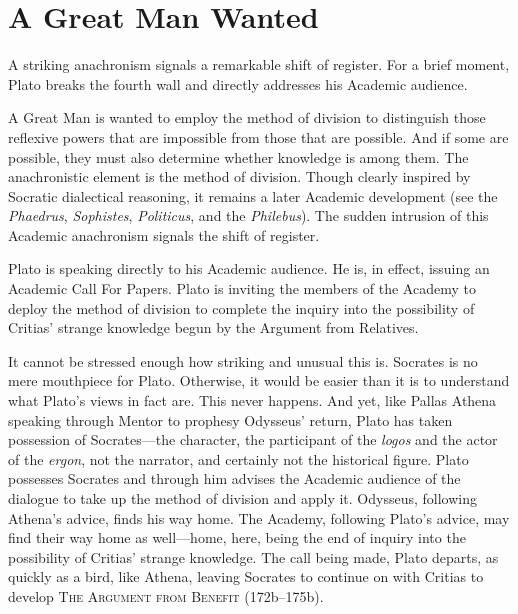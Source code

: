 
\section{A Great Man Wanted} %
\label{sec:a_great_man_wanted}

A striking anachronism signals a remarkable shift of register. For a brief moment, Plato breaks the fourth wall and directly addresses his Academic audience.

A Great Man is wanted to employ the method of division to distinguish those reflexive powers that are impossible from those that are possible. And if some are possible, they must also determine whether knowledge is among them. The anachronistic element is the method of division. Though clearly inspired by Socratic dialectical reasoning, it remains a later Academic development (see the \emph{Phaedrus}, \emph{Sophistes}, \emph{Politicus}, and the \emph{Philebus}). The sudden intrusion of this Academic anachronism signals the shift of register.

Plato is speaking directly to his Academic audience. He is, in effect, issuing an Academic Call For Papers. Plato is inviting the members of the Academy to deploy the method of division to complete the inquiry into the possibility of Critias' strange knowledge begun by the Argument from Relatives. 

It cannot be stressed enough how striking and unusual this is. Socrates is no mere mouthpiece for Plato. Otherwise, it would be easier than it is to understand what Plato's views in fact are. This never happens. And yet, like Pallas Athena speaking through Mentor to prophesy Odysseus' return, Plato has taken possession of Socrates—the character, the participant of the \emph{logos} and the actor of the \emph{ergon}, not the narrator, and certainly not the historical figure. Plato possesses Socrates and through him advises the Academic audience of the dialogue to take up the method of division and apply it. Odysseus, following Athena's advice, finds his way home. The Academy, following Plato's advice, may find their way home as well—home, here, being the end of inquiry into the possibility of Critias' strange knowledge. The call being made, Plato departs, as quickly as a bird, like Athena, leaving Socrates to continue on with Critias to develop \textsc{The Argument from Benefit} (172b–175b).

